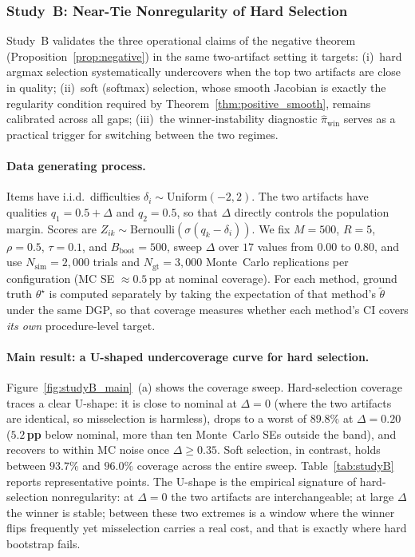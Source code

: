 \subsubsection{Study~B: Near-Tie Nonregularity of Hard Selection}
\label{sec:studyB}

Study~B validates the three operational claims of the negative theorem (Proposition~\ref{prop:negative}) in the same two-artifact setting it targets: (i)~hard argmax selection systematically undercovers when the top two artifacts are close in quality; (ii)~soft (softmax) selection, whose smooth Jacobian is exactly the regularity condition required by Theorem~\ref{thm:positive_smooth}, remains calibrated across all gaps; (iii)~the winner-instability diagnostic $\widehat\pi_{\mathrm{win}}$ serves as a practical trigger for switching between the two regimes.

\paragraph{Data generating process.}
Items have i.i.d.\ difficulties $\delta_i\sim\mathrm{Uniform}(-2,2)$.
The two artifacts have qualities $q_1 = 0.5 + \Delta$ and $q_2 = 0.5$, so that $\Delta$ directly controls the population margin.
Scores are $Z_{ik}\sim\mathrm{Bernoulli}(\sigma(q_k - \delta_i))$.
We fix $M{=}500$, $R{=}5$, $\rho{=}0.5$, $\tau{=}0.1$, and $B_{\mathrm{boot}}{=}500$, sweep $\Delta$ over $17$ values from $0.00$ to $0.80$, and use $N_{\mathrm{sim}}{=}2{,}000$ trials and $N_{\mathrm{gt}}{=}3{,}000$ Monte~Carlo replications per configuration (MC SE $\approx 0.5$\,pp at nominal coverage).
For each method, ground truth $\theta^\star$ is computed separately by taking the expectation of that method's $\widetilde\theta$ under the same DGP, so that coverage measures whether each method's CI covers \emph{its own} procedure-level target.

\paragraph{Main result: a U-shaped undercoverage curve for hard selection.}
Figure~\ref{fig:studyB_main}~(a) shows the coverage sweep.
Hard-selection coverage traces a clear U-shape: it is close to nominal at $\Delta{=}0$ (where the two artifacts are identical, so misselection is harmless), drops to a worst of \textbf{$89.8\%$} at $\Delta{=}0.20$ (\textbf{$5.2$\,pp} below nominal, more than ten Monte~Carlo SEs outside the band), and recovers to within MC noise once $\Delta\ge 0.35$.
Soft selection, in contrast, holds between $93.7\%$ and $96.0\%$ coverage across the entire sweep.
Table~\ref{tab:studyB} reports representative points.
The U-shape is the empirical signature of hard-selection nonregularity: at $\Delta{=}0$ the two artifacts are interchangeable; at large $\Delta$ the winner is stable; between these two extremes is a window where the winner flips frequently yet misselection carries a real cost, and that is exactly where hard bootstrap fails.

